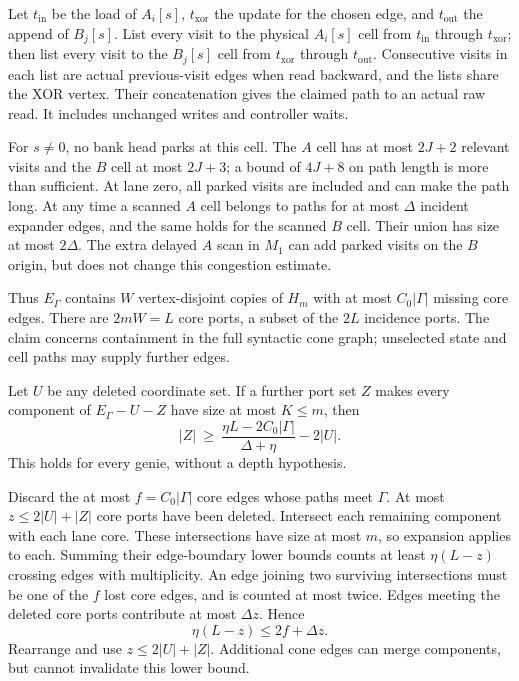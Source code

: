\begin{informalproof}
Let $t_{\mathrm{in}}$ be the load of $A_i[s]$, $t_{\mathrm{xor}}$ the update for the
chosen edge, and $t_{\mathrm{out}}$ the append of $B_j[s]$.  List every visit
to the physical $A_i[s]$ cell from $t_{\mathrm{in}}$ through $t_{\mathrm{xor}}$;
then list every visit to the $B_j[s]$ cell from $t_{\mathrm{xor}}$ through
$t_{\mathrm{out}}$.  Consecutive visits in each list are actual previous-visit
edges when read backward, and the lists share the XOR vertex.  Their
concatenation gives the claimed path to an actual raw read.  It includes
unchanged writes and controller waits.

For $s\ne0$, no bank head parks at this cell.  The $A$ cell has at most
$2J+2$ relevant visits and the $B$ cell at most $2J+3$; a bound of
$4J+8$ on path length is more than sufficient.  At lane zero, all parked
visits are included and can make the path long.  At any time a scanned
$A$ cell belongs to paths for at most $\Delta$ incident expander edges,
and the same holds for the scanned $B$ cell.  Their union has size at
most $2\Delta$.  The extra delayed $A$ scan in $M_1$ can add parked
visits on the $B$ origin, but does not change this congestion estimate.
\end{informalproof}

Thus $E_\Gamma$ contains $W$ vertex-disjoint copies of $H_m$ with at most
$C_0|\Gamma|$ missing core edges.  There are $2mW=L$ core ports, a subset
of the $2L$ incidence ports.  The claim concerns containment in the full
syntactic cone graph; unselected state and cell paths may supply further
edges.

\begin{proposition}\label{prop:ne-separator}
\notformalized
Let $U$ be any deleted coordinate set.  If a further port set $Z$ makes
every component of $E_\Gamma-U-Z$ have size at most $K\le m$, then
\[
 |Z|\ \ge\ \frac{\eta L-2C_0|\Gamma|}{\Delta+\eta}-2|U|.
\]
This holds for every genie, without a depth hypothesis.
\end{proposition}

\begin{informalproof}
Discard the at most $f=C_0|\Gamma|$ core edges whose paths meet $\Gamma$.
At most $z\le2|U|+|Z|$ core ports have been deleted.  Intersect each
remaining component with each lane core.  These intersections have size
at most $m$, so expansion applies to each.  Summing their edge-boundary
lower bounds counts at least $\eta(L-z)$ crossing edges with multiplicity.
An edge joining two surviving intersections must be one of the $f$ lost
core edges, and is counted at most twice.  Edges meeting the deleted core
ports contribute at most $\Delta z$.  Hence
\[
 \eta(L-z)\le2f+\Delta z.
\]
Rearrange and use $z\le2|U|+|Z|$.  Additional cone edges can merge
components, but cannot invalidate this lower bound.
\end{informalproof}

